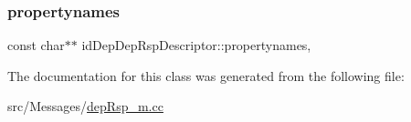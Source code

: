 \subsubsection{\texorpdfstring{propertynames}{propertynames}}
{\footnotesize\ttfamily const char$\ast$$\ast$ id\+Dep\+Dep\+Rsp\+Descriptor\+::propertynames\hspace{0.3cm}{\ttfamily [mutable]}, {\ttfamily [private]}}



The documentation for this class was generated from the following file\+:\begin{DoxyCompactItemize}
\item 
src/\+Messages/\hyperlink{depRsp__m_8cc}{dep\+Rsp\+\_\+m.\+cc}\end{DoxyCompactItemize}
